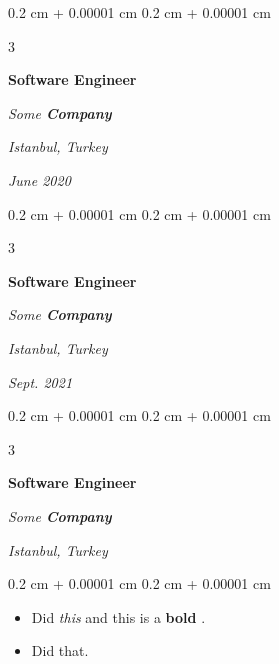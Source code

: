 \documentclass[10pt, letterpaper]{article}
\newenvironment{highlights}{
    \begin{itemize}[
        topsep=0.10 cm,
        parsep=0.10 cm,
        partopsep=0pt,
        itemsep=0pt,
        leftmargin=0.4 cm + 10pt + 0.6 cm
    ]
}{
    \end{itemize}
} %
\newenvironment{onecolentry}{
    \begin{adjustwidth}{
        0.2 cm + 0.00001 cm
    }{
        0.2 cm + 0.00001 cm
    }
}{
    \end{adjustwidth}
} %
\newenvironment{threecolentry}[3][]{
    \onecolentry
    \def\thirdColumn{#3}
    \setcolumnwidth{0.6 cm, \fill, 4.5 cm}
    \begin{paracol}{3}
    #2 \switchcolumn
}{
    \switchcolumn \raggedleft \thirdColumn
    \end{paracol}
    \endonecolentry
} %
\let\hrefWithoutArrow\href
\renewcommand{\href}[2]{\hrefWithoutArrow{#1}{\mbox{\ifthenelse{\equal{#2}{}}{ }{#2 }\raisebox{.15ex}{\footnotesize \faExternalLink*}}}}
\begin{document}
        \vspace{0.2 cm-3px}

        \begin{threecolentry}{
            \vspace*{\fill}
            \textbullet
            \vspace*{3px}
            \vspace*{\fill}
        }{
        \textit{Istanbul, Turkey}    
            
        \textit{June 2020}}
            \textbf{Software Engineer}
            
            \textit{Some \textbf{Company}}
        \end{threecolentry}



        \vspace{0.2 cm-3px}

        \begin{threecolentry}{
            \vspace*{\fill}
            \textbullet
            \vspace*{3px}
            \vspace*{\fill}
        }{
        \textit{Istanbul, Turkey}    
            
        \textit{Sept. 2021}}
            \textbf{Software Engineer}
            
            \textit{Some \textbf{Company}}
        \end{threecolentry}



        \vspace{0.2 cm-3px}

        \begin{threecolentry}{
            \vspace*{\fill}
            \textbullet
            \vspace*{3px}
            \vspace*{\fill}
        }{
        \textit{Istanbul, Turkey}    
            
        }
            \textbf{Software Engineer}
            
            \textit{Some \textbf{Company}}
        \end{threecolentry}

        \vspace{0.10 cm-3px}
        \begin{onecolentry}
            \begin{highlights}
                \item Did \textit{this} and this is a \textbf{bold} \href{https://example.com}{link}.
                \item Did that.
            \end{highlights}
        \end{onecolentry}
\end{document}
